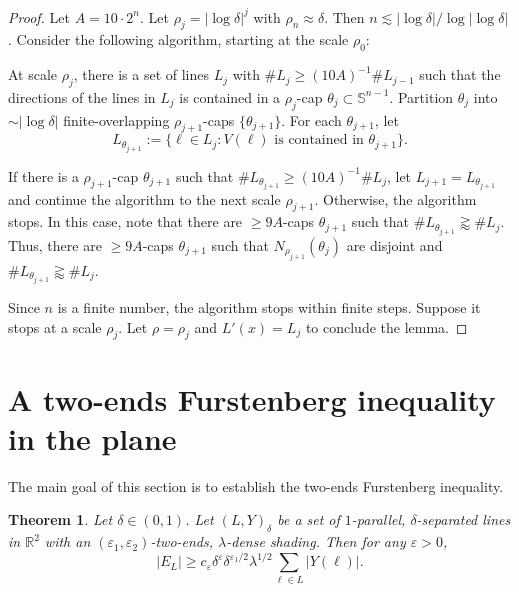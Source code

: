 \documentclass{amsart}
\numberwithin{equation}{section}
\newtheorem{theorem}{Theorem}[section]
\newcommand{\de}{\delta}
\newcommand{\e}{\varepsilon}
\newcommand{\la}{\lambda}
\newcommand{\ZR}{\mathbb{R}}
\newcommand{\ZS}{\mathbb{S}}
\begin{document}
\begin{proof}
Let $A=10\cdot 2^n$. 
Let $\rho_{j}=|\log\de|^j$ with $\rho_n\approx \de$. 
Then $n\lesssim |\log\de|/\log|\log\de|$. 
Consider the following algorithm, starting at the scale $\rho_0$:

At scale $\rho_j$, there is a set of lines $L_j$ with $\# L_j\geq (10A)^{-1} \# L_{j-1}$ such that the directions of the lines in $L_j$ is contained in a $\rho_j$-cap $\theta_j\subset\ZS^{n-1}$. 
Partition $\theta_j$ into $\sim |\log\de|$ finite-overlapping $\rho_{j+1}$-caps $\{\theta_{j+1}\}$. 
For each $\theta_{j+1}$, let 
\begin{equation}
    L_{\theta_{j+1}}:=\{\ell\in L_j:\text{$V(\ell)$ is contained in }\theta_{j+1}\}.
\end{equation}

If there is a $\rho_{j+1}$-cap $\theta_{j+1}$ such that $\# L_{\theta_{j+1}}\geq  (10A)^{-1} \# L_{j}$, let $L_{j+1}=L_{\theta_{j+1}}$ and continue the algorithm to the next scale $\rho_{j+1}$. 
Otherwise, the algorithm stops. 
In this case, note that there are $\geq 9A$-caps $\theta_{j+1}$ such that $ \#L_{\theta_{j+1}}\gtrapprox \# L_j$. 
Thus, there are $\geq 9A$-caps $\theta_{j+1}$ such that $N_{\rho_{j+1}}(\theta_j)$ are disjoint and $ \#L_{\theta_{j+1}}\gtrapprox \# L_j$. 
 
Since $n$ is a finite number, the algorithm stops within finite steps. 
Suppose it stops at a scale $\rho_j$. 
Let $\rho=\rho_j$ and $L'(x)=L_j$ to conclude the lemma. \qedhere

\end{proof}




\bigskip


\section{A two-ends Furstenberg inequality in the plane} \label{section: two-ends Furstenberg2d}




\smallskip

The main goal of this section is to establish the two-ends Furstenberg inequality.
\begin{theorem}
\label{two-ends-furstenberg}
Let $\de\in(0,1)$.
Let $(L,Y)_\de$ be a set of $1$-parallel, $\de$-separated lines in $\ZR^2$ with an $(\e_1, \e_2)$-two-ends, $\lambda$-dense shading. Then for any $\e>0$,
\begin{equation}
\label{eq:thm2.1}
    |E_L|\geq c_\e\de^{\e}\de^{\e_1/2} \la^{1/2}\sum_{\ell\in L}|Y(\ell)|.
\end{equation}
\end{theorem}
\end{document}
